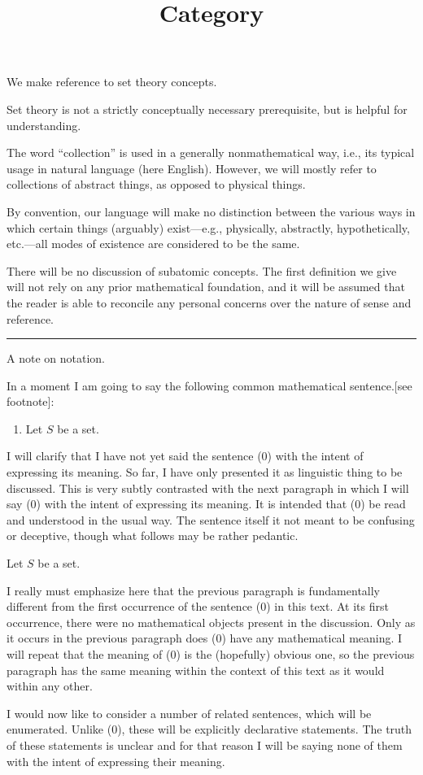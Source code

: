 \documentclass[12pt]{article}
\title{Category \\
    \large 
}
\author{}
\date{}
\newcommand{\sepline}{\rule{\textwidth}{0.4pt}}
\theoremstyle{definition}
\newcommand{\<}{\left\langle}
\renewcommand{\>}{\right\rangle}
\renewcommand{\_}[1]{{_{#1}}}
\begin{document}
We make reference to set theory concepts.

Set theory is not a strictly conceptually necessary prerequisite, but is helpful for understanding.

The word ``collection'' is used in a generally nonmathematical way, i.e., its typical usage in natural language (here English).
However, we will mostly refer to collections of abstract things, as opposed to physical things.

By convention, our language will make no distinction between the various ways in which certain things (arguably) exist---e.g., physically, abstractly, hypothetically, etc.---all modes of existence are considered to be the same.

There will be no discussion of subatomic concepts.
The first definition we give will not rely on any prior mathematical foundation, and it will be assumed that the reader is able to reconcile any personal concerns over the nature of sense and reference.

\sepline

A note on notation.

In a moment I am going to say the following common mathematical sentence.[see footnote]:
\begin{enumerate}[(0)]
    \item Let $S$ be a set.
\end{enumerate}
I will clarify that I have not yet said the sentence (0) with the intent of expressing its meaning.
So far, I have only presented it as linguistic thing to be discussed.
This is very subtly contrasted with the next paragraph in which I will say (0) with the intent of expressing its meaning.
It is intended that (0) be read and understood in the usual way.
The sentence itself it not meant to be confusing or deceptive, though what follows may be rather pedantic.

Let $S$ be a set.

I really must emphasize here that the previous paragraph is fundamentally different from the first occurrence of the sentence (0) in this text.
At its first occurrence, there were no mathematical objects present in the discussion.
Only as it occurs in the previous paragraph does (0) have any mathematical meaning.
I will repeat that the meaning of (0) is the (hopefully) obvious one, so the previous paragraph has the same meaning within the context of this text as it would within any other.

I would now like to consider a number of related sentences, which will be enumerated.
Unlike (0), these will be explicitly declarative statements.
The truth of these statements is unclear and for that reason I will be saying none of them with the intent of expressing their meaning.
\end{document}
